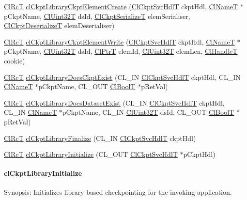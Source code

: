 \begin{CompactItemize}
\item 
\hyperlink{group__group2_ga18}{Cl\-Rc\-T} \hyperlink{group__group10_ga12}{cl\-Ckpt\-Library\-Ckpt\-Element\-Create} (\hyperlink{cl_ckpt_api_8h_a12}{Cl\-Ckpt\-Svc\-Hdl\-T} ckpt\-Hdl, \hyperlink{struct_cl_name_t}{Cl\-Name\-T} $\ast$p\-Ckpt\-Name, \hyperlink{group__group2_ga1}{Cl\-Uint32T} ds\-Id, \hyperlink{group__group10_ga0}{Cl\-Ckpt\-Serialize\-T} elem\-Serialiser, \hyperlink{group__group10_ga1}{Cl\-Ckpt\-Deserialize\-T} elem\-Deserialiser)
\item 
\hyperlink{group__group2_ga18}{Cl\-Rc\-T} \hyperlink{group__group10_ga13}{cl\-Ckpt\-Library\-Ckpt\-Element\-Write} (\hyperlink{cl_ckpt_api_8h_a12}{Cl\-Ckpt\-Svc\-Hdl\-T} ckpt\-Hdl, \hyperlink{struct_cl_name_t}{Cl\-Name\-T} $\ast$p\-Ckpt\-Name, \hyperlink{group__group2_ga1}{Cl\-Uint32T} ds\-Id, \hyperlink{group__group2_ga17}{Cl\-Ptr\-T} elem\-Id, \hyperlink{group__group2_ga1}{Cl\-Uint32T} elem\-Len, \hyperlink{group__group2_ga10}{Cl\-Handle\-T} cookie)
\item 
\hyperlink{group__group2_ga18}{Cl\-Rc\-T} \hyperlink{group__group10_ga10}{cl\-Ckpt\-Library\-Does\-Ckpt\-Exist} (CL\_\-IN \hyperlink{cl_ckpt_api_8h_a12}{Cl\-Ckpt\-Svc\-Hdl\-T} ckpt\-Hdl, CL\_\-IN \hyperlink{struct_cl_name_t}{Cl\-Name\-T} $\ast$p\-Ckpt\-Name, CL\_\-OUT \hyperlink{group__group2_ga8}{Cl\-Bool\-T} $\ast$p\-Ret\-Val)
\item 
\hyperlink{group__group2_ga18}{Cl\-Rc\-T} \hyperlink{group__group10_ga11}{cl\-Ckpt\-Library\-Does\-Dataset\-Exist} (CL\_\-IN \hyperlink{cl_ckpt_api_8h_a12}{Cl\-Ckpt\-Svc\-Hdl\-T} ckpt\-Hdl, CL\_\-IN \hyperlink{struct_cl_name_t}{Cl\-Name\-T} $\ast$p\-Ckpt\-Name, CL\_\-IN \hyperlink{group__group2_ga1}{Cl\-Uint32T} ds\-Id, CL\_\-OUT \hyperlink{group__group2_ga8}{Cl\-Bool\-T} $\ast$p\-Ret\-Val)
\item 
\hyperlink{group__group2_ga18}{Cl\-Rc\-T} \hyperlink{group__group10_ga3}{cl\-Ckpt\-Library\-Finalize} (CL\_\-IN \hyperlink{cl_ckpt_api_8h_a12}{Cl\-Ckpt\-Svc\-Hdl\-T} ckpt\-Hdl)
\item 
\hyperlink{group__group2_ga18}{Cl\-Rc\-T} \hyperlink{group__group10_ga2}{cl\-Ckpt\-Library\-Initialize} (CL\_\-OUT \hyperlink{cl_ckpt_api_8h_a12}{Cl\-Ckpt\-Svc\-Hdl\-T} $\ast$p\-Ckpt\-Hdl)
\end{CompactItemize}
\hypertarget{pageckpt201}{}\paragraph{cl\-Ckpt\-Library\-Initialize}\label{pageckpt201}
\begin{Desc}
\item[Synopsis:]Initializes library based checkpointing for the invoking application.\end{Desc}

